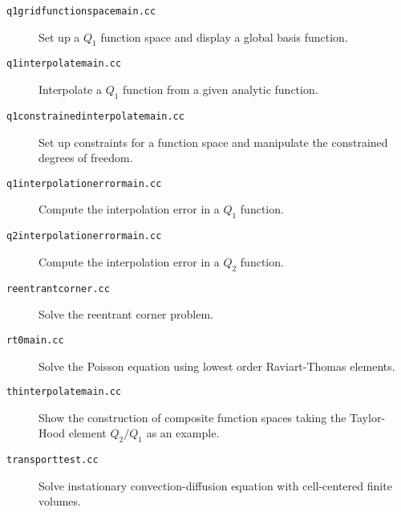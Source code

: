{\begin{description}
\item[\texttt{q1gridfunctionspacemain.cc}]
Set up a $Q_1$ function space and display a global basis function.

\item[\texttt{q1interpolatemain.cc}]
Interpolate a $Q_1$ function from a given analytic function.

\item[\texttt{q1constrainedinterpolatemain.cc}]
Set up constraints for a function space and manipulate the constrained
degrees of freedom.

\item[\texttt{q1interpolationerrormain.cc}]
Compute the interpolation error in a $Q_1$ function.

\item[\texttt{q2interpolationerrormain.cc}]
Compute the interpolation error in a $Q_2$ function.

\item[\texttt{reentrantcorner.cc}]
Solve the reentrant corner problem.

\item[\texttt{rt0main.cc}]
Solve the Poisson equation using lowest order Raviart-Thomas elements.

\item[\texttt{thinterpolatemain.cc}]
Show the construction of composite function spaces taking the
Taylor-Hood element $Q_2/Q_1$ as an example.

\item[\texttt{transporttest.cc}] Solve instationary convection-diffusion equation with
cell-centered finite volumes.
\end{description}

\cleardoublepage
}
